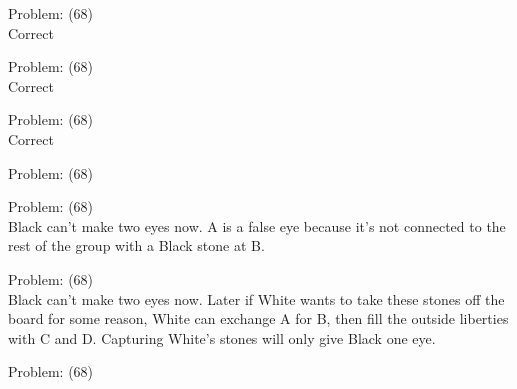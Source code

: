 \documentclass[11pt]{article}
\begin{document}
\begin{minipage}[t]{0.5\textwidth}
  {\centering
  
Problem: (68)\\
Correct\\
  }
\end{minipage}
\begin{minipage}[t]{0.5\textwidth}
  {\centering
  
Problem: (68)\\
Correct\\
  }
\end{minipage}
\begin{minipage}[t]{0.5\textwidth}
  {\centering
  
Problem: (68)\\
Correct\\
  }
\end{minipage}
\begin{minipage}[t]{0.5\textwidth}
  {\centering
  
Problem: (68)\\
  }
\end{minipage}
\begin{minipage}[t]{0.5\textwidth}
  {\centering
  
Problem: (68)\\
Black can't make two eyes now. A is a false eye because it's not connected to the rest of the group with a Black stone at B.\\
  }
\end{minipage}
\begin{minipage}[t]{0.5\textwidth}
  {\centering
  
Problem: (68)\\
Black can't make two eyes now. Later if White wants to take these stones off the board for some reason, White can exchange A for B, then fill the outside liberties with C and D. Capturing White's stones will only give Black one eye.\\
  }
\end{minipage}
\begin{minipage}[t]{0.5\textwidth}
  {\centering
  
Problem: (68)\\
  }
\end{minipage}
\end{document}
